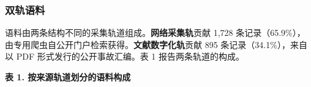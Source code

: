 \documentclass[11pt]{article}
\begin{document}
\subsubsection{{\cjkfont 双\allowbreak 轨\allowbreak 语\allowbreak 料}}
{\cjkfont 语\allowbreak 料\allowbreak 由\allowbreak 两\allowbreak 条\allowbreak 结\allowbreak 构\allowbreak 不\allowbreak 同\allowbreak 的\allowbreak 采\allowbreak 集\allowbreak 轨\allowbreak 道\allowbreak 组\allowbreak 成\allowbreak 。}\textbf{{\cjkfont 网\allowbreak 络\allowbreak 采\allowbreak 集\allowbreak 轨}}{\cjkfont 贡\allowbreak 献} 1,728 {\cjkfont 条\allowbreak 记\allowbreak 录\allowbreak （}65.9\%{\cjkfont ）\allowbreak ，\allowbreak 由\allowbreak 专\allowbreak 用\allowbreak 爬\allowbreak 虫\allowbreak 自\allowbreak 公\allowbreak 开\allowbreak 门\allowbreak 户\allowbreak 检\allowbreak 索\allowbreak 获\allowbreak 得\allowbreak 。}\textbf{{\cjkfont 文\allowbreak 献\allowbreak 数\allowbreak 字\allowbreak 化\allowbreak 轨}}{\cjkfont 贡\allowbreak 献} 895 {\cjkfont 条\allowbreak 记\allowbreak 录\allowbreak （}34.1\%{\cjkfont ）\allowbreak ，\allowbreak 来\allowbreak 自\allowbreak 以} PDF {\cjkfont 形\allowbreak 式\allowbreak 发\allowbreak 行\allowbreak 的\allowbreak 公\allowbreak 开\allowbreak 事\allowbreak 故\allowbreak 汇\allowbreak 编\allowbreak 。\allowbreak 表} 1 {\cjkfont 报\allowbreak 告\allowbreak 两\allowbreak 条\allowbreak 轨\allowbreak 道\allowbreak 的\allowbreak 构\allowbreak 成\allowbreak 。}

\textbf{{\cjkfont 表} 1. {\cjkfont 按\allowbreak 来\allowbreak 源\allowbreak 轨\allowbreak 道\allowbreak 划\allowbreak 分\allowbreak 的\allowbreak 语\allowbreak 料\allowbreak 构\allowbreak 成}}
\end{document}
